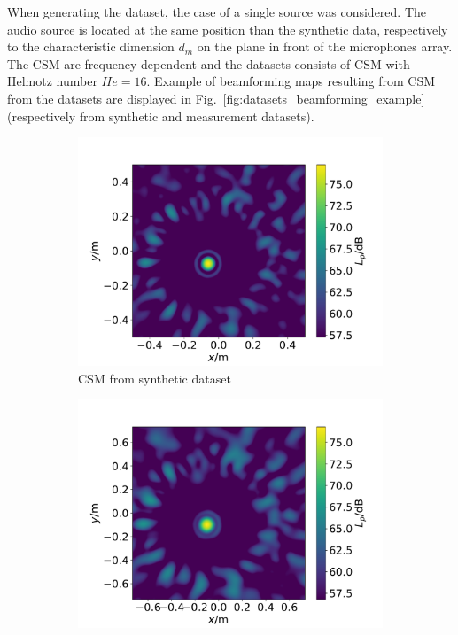 \documentclass[11pt,a4paper,twoside]{report}
\begin{document}
When generating the dataset, the case of a single source was considered. The audio source is located at the same position than the synthetic data, respectively to the characteristic dimension $d_m$ on the plane in front of the microphones array. The CSM are frequency dependent and the datasets consists of CSM with Helmotz number $He = 16$. Example of beamforming maps resulting from CSM from the datasets are displayed in Fig.~\ref{fig:datasets_beamforming_example} (respectively from synthetic and measurement datasets).


\begin{figure}
    \centering
    \begin{subfigure}{0.45\textwidth}
        \centering
        \includegraphics[width=1.3\textwidth]{figs/datasets_beamforming_example_synthetic.pdf}
        \caption{CSM from synthetic dataset}
        \label{fig:datasets_beamforming_example_synthetic}
    \end{subfigure}
    \hfill
    \begin{subfigure}{0.45\textwidth}
        \centering
        \includegraphics[width=1.3\textwidth]{figs/datasets_beamforming_example_measurement.pdf}

\end{subfigure}
\end{figure}
\end{document}
